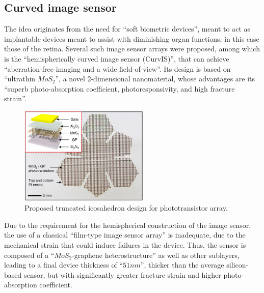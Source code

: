 \subsection{Curved image sensor}

The idea originates from the need for ``soft biometric devices'', meant to act as implantable devices
meant to assist with diminishing organ functions, in this case those of the retina. Several such image
sensor arrays were proposed, among which is the ``hemispherically curved image sensor (CurvIS)'', that
can achieve ``aberration-free imaging and a wide field-of-view''. Its design is based on ``ultrathin
\(MoS_{2}\)'', a novel 2-dimensional nanomaterial, whose advantages are its ``superb photo-absorption
coefficient, photoresponsivity, and high fracture strain''.~\cite{withHexagons}

\begin{figure}[H]
    \includegraphics[width=0.55\textwidth, height=0.45\textwidth]{resources/png/paper_sensor.png}
    \caption{Proposed truncated icosahedron design for phototransistor array.~\cite{withHexagons}~\label{figSensor}}
\end{figure}

Due to the requirement for the hemispherical construction of the image sensor, the use of a classical 
``film-type image sensor array'' is inadequate, due to the mechanical strain that could induce failures
in the device. Thus, the sensor is composed of a ``\(MoS_{2}\)-graphene heterostructure'' as well as other
sublayers, leading to a final device thickness of ``\(51nm\)'', thicker than the average silicon-based 
sensor, but with significantly greater fracture strain and higher photo-absorption coefficient.